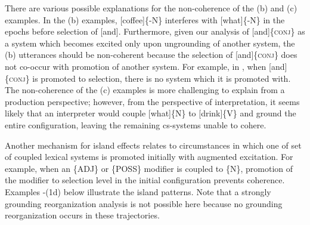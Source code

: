   There are various possible explanations for the non-coherence of the (b) and (c) examples. In the (b) examples, [coffee]\{-N\} interferes with [what]\{-N\} in the epochs before selection of [and]. Furthermore, given our analysis of [and]\{\textsc{conj}\} as a system which becomes excited only upon ungrounding of another system, the (b) utterances should be non-coherent because the selection of [and]\{\textsc{conj}\} does not co-occur with promotion of another system. For example, in , when [and]\{\textsc{conj}\} is promoted to selection, there is no system which it is promoted with. The non-coherence of the (c) examples is more challenging to explain from a production perspective; however, from the perspective of interpretation, it seems likely that an interpreter would couple [what]\{N\} to [drink]\{V\} and ground the entire configuration, leaving the remaining cs-systems unable to cohere.

Another mechanism for island effects relates to circumstances in which one of set of coupled lexical systems is promoted initially with augmented excitation. For example, when an \{ADJ\} or \{POSS\} modifier is coupled to \{N\}, promotion of the modifier to selection level in the initial configuration prevents coherence. Examples -(1d) below illustrate the island patterns. Note that a strongly grounding reorganization analysis is not possible here because no grounding reorganization occurs in these trajectories.

